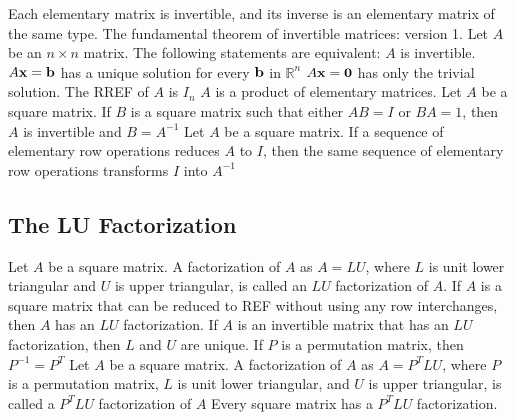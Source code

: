 \documentclass{article}
\begin{document}
\begin{outline}
        \1 Each elementary matrix is invertible, and its inverse is an elementary matrix of the same type. 
        \1 The fundamental theorem of invertible matrices: version 1. Let $A$ be an \(n\times n\) matrix. The following statements are equivalent: 
            \2 \(A\) is invertible. 
            \2 \(A\vb x=\vb b\) has a unique solution for every \(\vb b\) in \(\mathbb R^n\)
            \2 \(A\vb x=\vb 0\) has only the trivial solution. 
            \2 The RREF of \(A\) is \(I_n\)
            \2 \(A\) is a product of elementary matrices. 
        \1 Let \(A\) be a square matrix. If \(B\) is a square matrix such that either \(AB=I\) or \(BA=1\), then \(A\) is invertible and \(B=A^{-1}\)
        \1 Let \(A\) be a square matrix. If a sequence of elementary row operations reduces \(A\) to \(I\), then the same sequence of elementary row operations transforms \(I\) into \(A^{-1}\)

   \end{outline}
   \subsection{The LU Factorization}
   \begin{outline}
        \1 Let \(A\) be a square matrix. A factorization of \(A\) as \(A=LU\), where \(L\) is unit lower triangular and \(U\) is upper triangular, is called an \(LU\) factorization of \(A\). 
        \1 If \(A\) is a square matrix that can be reduced to REF without using any row interchanges, then \(A\) has an \(LU\) factorization. 
        \1 If \(A\) is an invertible matrix that has an \(LU\) factorization, then \(L\) and \(U\) are unique. 
        \1 If \(P\) is a permutation matrix, then \(P^{-1}=P^T\)
        \1 Let \(A\) be a square matrix. A factorization of \(A\) as \(A=P^TLU\), where \(P\) is a permutation matrix, $L$ is unit lower triangular, and $U$ is upper triangular, is called a \(P^TLU\) factorization of \(A\)
        \1 Every square matrix has a \(P^TLU\) factorization. 
   \end{outline}
\end{document}
